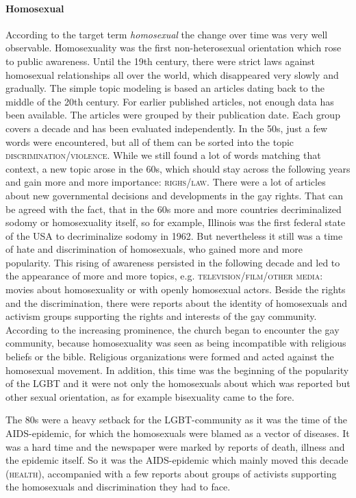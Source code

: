 \documentclass[10pt,a4paper,twocolumn]{scrartcl}
\begin{document}
\paragraph*{Homosexual} According to the target term \textit{homosexual} the change over time was very well observable. Homosexuality was the first non-heterosexual orientation which rose to public awareness. Until the 19th century, there were strict laws against homosexual relationships all over the world, which disappeared very slowly and gradually. The simple topic modeling is based an articles dating back to the middle of the 20th century. For earlier published articles, not enough data has been available. The articles were grouped by their publication date. Each group covers a decade and has been evaluated independently. In the 50s, just a few words were encountered, but all of them can be sorted into the topic \textsc{discrimination/violence}. While we still found a lot of words matching that context, a new topic arose in the 60s, which should stay across the following years and gain more and more importance: \textsc{righs/law}. There were a lot of articles about new governmental decisions and developments in the gay rights. That can be agreed with the fact, that in the 60s more and more countries decriminalized sodomy or homosexuality itself, so for example, Illinois was the first federal state of the USA to decriminalize sodomy in 1962. But nevertheless it still was a time of hate and discrimination of homosexuals, who gained more and more popularity. This rising of awareness persisted in the following decade and led to the appearance of more and more topics, e.g. \textsc{television/film/other media}: movies about homosexuality or with openly homosexual actors. Beside the rights and the discrimination, there were reports about the identity of homosexuals and activism groups supporting the rights and interests of the gay community. According to the increasing prominence, the church began to encounter the gay community, because homosexuality was seen as being incompatible with religious beliefs or the bible. Religious organizations were formed and acted against the homosexual movement. In addition, this time was the beginning of the popularity of the LGBT and it were not only the homosexuals about which was reported but other sexual orientation, as for example bisexuality came to the fore.

The 80s were a heavy setback for the LGBT-community as it was the time of the AIDS-epidemic, for which the homosexuals were blamed as a vector of diseases. It was a hard time and the newspaper were marked by reports of death, illness and the epidemic itself. So it was the AIDS-epidemic which mainly moved this decade (\textsc{health}), accompanied with a few reports about groups of activists supporting the homosexuals and discrimination they had to face.
\end{document}
